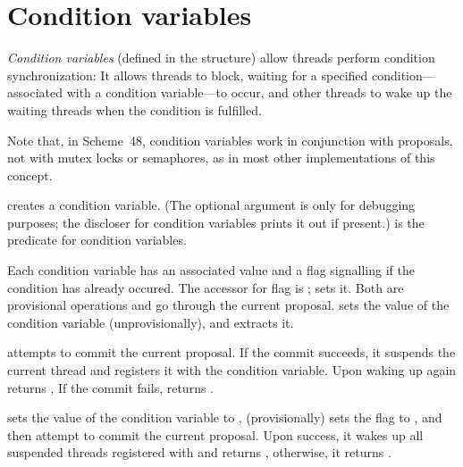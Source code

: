 \section{Condition variables}

\textit{Condition variables} (defined in the 
structure) allow threads perform condition synchronization: It allows
threads to block, waiting for a specified condition---associated with a
condition variable---to occur, and other threads to wake up the waiting
threads when the condition is fulfilled.

Note that, in Scheme~48, condition variables work in conjunction with
proposals, not with mutex locks or semaphores, as in most other
implementations of this concept.

\begin{protos}
\end{protos}
%
 creates a condition variable.  (The optional
 argument is only for debugging purposes; the discloser for
condition variables prints it out if present.)   is the
predicate for condition variables.

Each condition variable has an associated value and a flag
 signalling if the condition has already occured.
The accessor for flag is ;
 sets it.  Both are provisional
operations and go through the current proposal.
 sets the value of the condition variable
(unprovisionally), and  extracts it.

 attempts to commit the
current proposal.  If the commit succeeds, it suspends the current
thread and registers it with the  condition variable.
Upon waking up again  returns
, If the commit fails, 
returns .

 sets the value of the
 condition variable to , (provisionally)
sets the  flag to , and then attempt to
commit the current proposal.  Upon success, it wakes up all suspended
threads registered with  and returns ,
otherwise, it returns .

